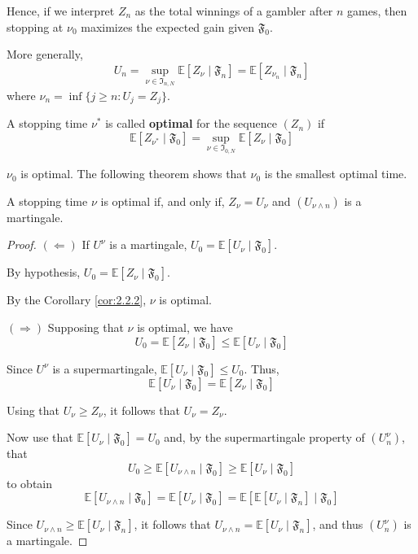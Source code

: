Hence, if we interpret $Z_n$ as the total winnings of a gambler after $n$ games, then stopping at $\nu_0$ maximizes the expected gain given $\mathfrak{F}_0$.

More generally, 
\begin{equation}\label{eq:202304221434}
    U_n = \sup_{\nu \in \mathfrak{I}_{n, N}} \mathbb{E}[Z_{\nu} \mid \mathfrak{F}_n] = \mathbb{E}[Z_{\nu_n} \mid \mathfrak{F}_n]
\end{equation}
where $\nu_n = \inf \{j \ge n : U_j = Z_j\}$.

\begin{definition}
    A stopping time $\nu^\ast$ is called \textbf{optimal} for the sequence $(Z_n)$ if
    \[
        \mathbb{E}[Z_{\nu^\ast} \mid \mathfrak{F}_0] = \sup_{\nu \in \mathfrak{I}_{0, N}} \mathbb{E}[Z_{\nu} \mid \mathfrak{F}_0]
    \]
\end{definition}

$\nu_0$ is optimal. The following theorem shows that $\nu_0$ is the smallest optimal time. 

\begin{theorem}
    A stopping time $\nu$ is optimal if, and only if, $Z_\nu = U_\nu$ and $(U_{\nu \wedge n})$ is a martingale. 
\end{theorem}

\begin{proof}
    $(\Leftarrow)$ If $U^\nu$ is a martingale, $U_0 = \mathbb{E}[U_\nu \mid \mathfrak{F}_0]$.
    
    By hypothesis, $U_0 = \mathbb{E}[Z_\nu \mid \mathfrak{F}_0]$.
    
    By the Corollary \ref{cor:2.2.2}, $\nu$ is optimal.

    $(\Rightarrow)$ Supposing that $\nu$ is optimal, we have 
    \[
        U_0 = \mathbb{E}[Z_\nu \mid \mathfrak{F}_0] \leq \mathbb{E}[U_\nu \mid \mathfrak{F}_0]
    \]

    Since $U^\nu$ is a supermartingale, $\mathbb{E}[U_\nu \mid \mathfrak{F}_0] \le U_0$. Thus,
    \[
        \mathbb{E}[U_\nu \mid \mathfrak{F}_0] = \mathbb{E}[Z_\nu \mid \mathfrak{F}_0]
    \]

    Using that $U_\nu \ge Z_\nu$, it follows that $U_\nu = Z_\nu$.

    Now use that $\mathbb{E}[U_\nu \mid \mathfrak{F}_0] = U_0$ and, by the supermartingale property of $(U_n^\nu)$, that 
    \[
        U_0 \ge \mathbb{E}[U_{\nu \wedge n} \mid \mathfrak{F}_0] \ge \mathbb{E}[U_\nu \mid \mathfrak{F}_0]
    \]
    to obtain 
    \[
        \mathbb{E}[U_{\nu \wedge n} \mid \mathfrak{F}_0] = \mathbb{E}[U_\nu \mid \mathfrak{F}_0] = \mathbb{E}[\mathbb{E}[U_\nu \mid \mathfrak{F}_n] \mid \mathfrak{F}_0]
    \]

    Since $U_{\nu \wedge n} \ge \mathbb{E}[U_\nu \mid \mathfrak{F}_n]$, it follows that $U_{\nu \wedge n} = \mathbb{E}[U_\nu \mid \mathfrak{F}_n]$, and thus $(U_n^\nu)$ is a martingale.
\end{proof}

